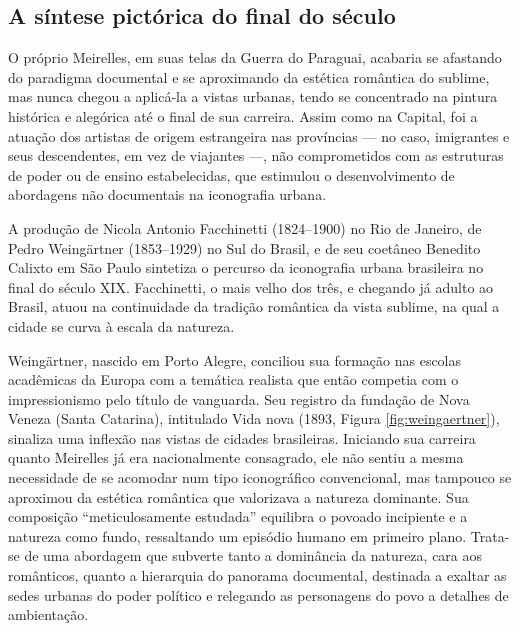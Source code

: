 \hypertarget{a-suxedntese-pictuxf3rica-do-final-do-suxe9culo}{%
\subsection{A síntese pictórica do final do
século}\label{a-suxedntese-pictuxf3rica-do-final-do-suxe9culo}}

O próprio Meirelles, em suas telas da Guerra do Paraguai, acabaria se
afastando do paradigma documental e se aproximando da estética romântica
do sublime, mas nunca chegou a aplicá-la a vistas urbanas, tendo se
concentrado na pintura histórica e alegórica até o final de sua
carreira. Assim como na Capital, foi a atuação dos artistas de origem
estrangeira nas províncias --- no caso, imigrantes e seus descendentes,
em vez de viajantes ---, não comprometidos com as estruturas de poder ou
de ensino estabelecidas, que estimulou o desenvolvimento de abordagens
não documentais na iconografia urbana.

A produção de Nicola Antonio Facchinetti (1824--1900) no Rio de Janeiro,
de Pedro Weingärtner (1853--1929) no Sul do Brasil, e de seu coetâneo
Benedito Calixto em São Paulo sintetiza o percurso da iconografia urbana
brasileira no final do século XIX. Facchinetti, o mais velho dos três, e
chegando já adulto ao Brasil, atuou na continuidade da tradição
romântica da vista sublime, na qual a cidade se curva à escala da
natureza.

Weingärtner, nascido em Porto Alegre, conciliou sua formação nas escolas
acadêmicas da Europa com a temática realista que então competia com o
impressionismo pelo título de vanguarda. Seu registro da fundação de
Nova Veneza (Santa Catarina), intitulado Vida nova (1893, Figura
\ref{fig:weingaertner}), sinaliza uma inflexão nas vistas de cidades
brasileiras. Iniciando sua carreira quanto Meirelles já era
nacionalmente consagrado, ele não sentiu a mesma necessidade de se
acomodar num tipo iconográfico convencional, mas tampouco se aproximou
da estética romântica que valorizava a natureza dominante. Sua
composição ``meticulosamente estudada'' \autocite{carvalho:2008paisagem}
equilibra o povoado incipiente e a natureza como fundo, ressaltando um
episódio humano em primeiro plano. Trata-se de uma abordagem que
subverte tanto a dominância da natureza, cara aos românticos, quanto a
hierarquia do panorama documental, destinada a exaltar as sedes urbanas
do poder político e relegando as personagens do povo a detalhes de
ambientação.

